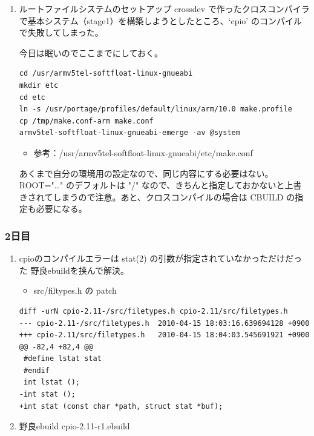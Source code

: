 \documentclass[11pt]{article}
\begin{document}
\begin{enumerate}
\begin{verbatim}
sudo ebuild /usr/portage/sys-fs/mtd-utils/mtd-utils-99999999.ebuild compile
sudo ebuild /usr/portage/sys-fs/mtd-utils/mtd-utils-99999999.ebuild merge
sudo ebuild /usr/portage/sys-fs/mtd-utils/mtd-utils-99999999.ebuild clean
\end{verbatim}
\item ルートファイルシステムのセットアップ
\label{sec:org46d3fbe}
crossdev で作ったクロスコンパイラで基本システム（stage1）を構築しようとしたところ、`cpio' のコンパイルで失敗してしまった。

今日は眠いのでここまでにしておく。

\begin{verbatim}
cd /usr/armv5tel-softfloat-linux-gnueabi
mkdir etc
cd etc
ln -s /usr/portage/profiles/default/linux/arm/10.0 make.profile
cp /tmp/make.conf-arm make.conf
armv5tel-softfloat-linux-gnueabi-emerge -av @system
\end{verbatim}

\begin{itemize}
\item 参考：/usr/armv5tel-softfloat-linux-gnueabi/etc/make.conf
\end{itemize}

あくまで自分の環境用の設定なので、同じ内容にする必要はない。ROOT="\ldots{}" のデフォルトは "/" なので、きちんと指定しておかないと上書きされてしまうので注意。あと、クロスコンパイルの場合は CBUILD の指定も必要になる。
\end{enumerate}
\subsubsection{2日目}
\label{sec:orgc858d9b}
\begin{enumerate}
\item cpioのコンパイルエラーは stat(2) の引数が指定されていなかっただけだった
\label{sec:org1e68f7e}
野良ebuildを挟んで解決。

\begin{itemize}
\item src/filtypes.h の patch
\end{itemize}

\begin{verbatim}
diff -urN cpio-2.11-/src/filetypes.h cpio-2.11/src/filetypes.h
--- cpio-2.11-/src/filetypes.h  2010-04-15 18:03:16.639694128 +0900
+++ cpio-2.11/src/filetypes.h   2010-04-15 18:04:03.545691921 +0900
@@ -82,4 +82,4 @@
 #define lstat stat
 #endif
 int lstat ();
-int stat ();
+int stat (const char *path, struct stat *buf);
\end{verbatim}
\item 野良ebuild cpio-2.11-r1.ebuild
\label{sec:org71177a4}
\end{enumerate}
\end{document}
